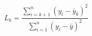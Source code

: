 \documentclass[12pt]{article}
\begin{document}
\pagestyle{empty}
\large
{}
\pagecolor{ehandbook}

\[
L_{k} = \frac{\sum_{i=k+1}^{n}{(y_{i} - \bar{y}_{k})^{2}}}
  {\sum_{i=1}^{n}{(y_{i} - \bar{y})^{2}}}
\]
\end{document}
